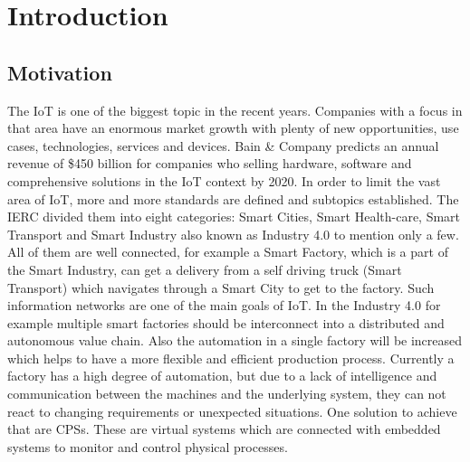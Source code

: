 \chapter{Introduction}
\minitoc\vspace{.5cm}

\section{Motivation}

The \ac{IoT} is one of the biggest topic in the recent years.
Companies with a focus in that area have an enormous market growth with plenty of new opportunities, use cases, technologies, services and devices.
Bain \& Company predicts an annual revenue of \$450 billion for companies who selling hardware, software and comprehensive solutions in the \ac{IoT} context by 2020.\autocite{Bosche:2016}
In order to limit the vast area of \ac{IoT}, more and more standards are defined and subtopics established.
The \ac{IERC} divided them into eight categories: Smart Cities, Smart Health-care, Smart Transport and Smart Industry also known as Industry 4.0 to mention only a few.\autocite[cf.][p. 7]{IERC:2011}
All of them are well connected, for example a Smart Factory, which is a part of the Smart Industry, can get a delivery from a self driving truck (Smart Transport) which navigates through a Smart City to get to the factory.
Such information networks are one of the main goals of \ac{IoT}.
In the Industry 4.0 for example multiple smart factories should be interconnect into a distributed and autonomous value chain.
Also the automation in a single factory will be increased which helps to have a more flexible and efficient production process.
Currently a factory has a high degree of automation, but due to a lack of intelligence and communication between the machines and the underlying system, they can not react to changing requirements or unexpected situations.
One solution to achieve that are \acp{CPS}.
These are virtual systems which are connected with embedded systems to monitor and control physical processes.\autocite[cf.][p. 363]{Lee:2008}
